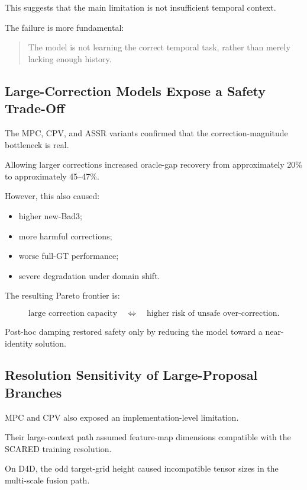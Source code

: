 \documentclass[11pt,a4paper]{article}
\begin{document}
This suggests that the main limitation is not insufficient temporal context.

The failure is more fundamental:

\begin{quote}
The model is not learning the correct temporal task, rather than merely lacking
enough history.
\end{quote}

\subsection{Large-Correction Models Expose a Safety Trade-Off}

The MPC, CPV, and ASSR variants confirmed that the correction-magnitude bottleneck
is real.

Allowing larger corrections increased oracle-gap recovery from approximately 20\%
to approximately 45--47\%.

However, this also caused:

\begin{itemize}[leftmargin=*]
    \item higher new-Bad3;
    \item more harmful corrections;
    \item worse full-GT performance;
    \item severe degradation under domain shift.
\end{itemize}

The resulting Pareto frontier is:

\begin{equation}
\text{large correction capacity}
\quad\Longleftrightarrow\quad
\text{higher risk of unsafe over-correction}.
\end{equation}

Post-hoc damping restored safety only by reducing the model toward a near-identity
solution.

\subsection{Resolution Sensitivity of Large-Proposal Branches}

MPC and CPV also exposed an implementation-level limitation.

Their large-context path assumed feature-map dimensions compatible with the SCARED
training resolution.

On D4D, the odd target-grid height caused incompatible tensor sizes in the
multi-scale fusion path.
\end{document}
